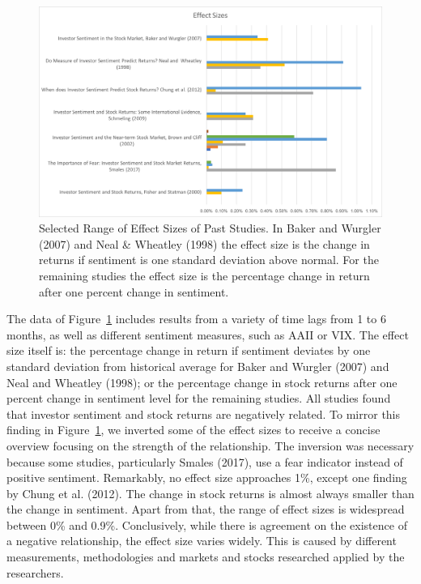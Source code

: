 \begin{figure}[ht]
\centering
\includegraphics[width=1\textwidth]{figures/effect-size.png}
\caption{\label{fig:figure20}Selected Range of Effect Sizes of Past Studies. In Baker and Wurgler (2007) and Neal \& Wheatley (1998) the effect size is the change in returns if sentiment is one standard deviation above normal. For the remaining studies the effect size is the percentage change in return after one percent change in sentiment.}
\end{figure}

The data of Figure~\ref{fig:figure20} includes results from a variety of time lags from 1 to 6 months, as well as different sentiment measures, such as AAII or VIX. The effect size itself is: the percentage change in return if sentiment deviates by one standard deviation from historical average for Baker and Wurgler (2007) and Neal and Wheatley (1998); or the percentage change in stock returns after one percent change in sentiment level for the remaining studies. All studies found that investor sentiment and stock returns are negatively related. To mirror this finding in Figure~\ref{fig:figure20}, we inverted some of the effect sizes to receive a concise overview focusing on the strength of the relationship. The inversion was necessary because some studies, particularly Smales (2017), use a fear indicator instead of positive sentiment. Remarkably, no effect size approaches 1\%, except one finding by Chung et al. (2012). The change in stock returns is almost always smaller than the change in sentiment. Apart from that, the range of effect sizes is widespread between 0\% and 0.9\%. Conclusively, while there is agreement on the existence of a negative relationship, the effect size varies widely. This is caused by different measurements, methodologies and markets and stocks researched applied by the researchers. 
